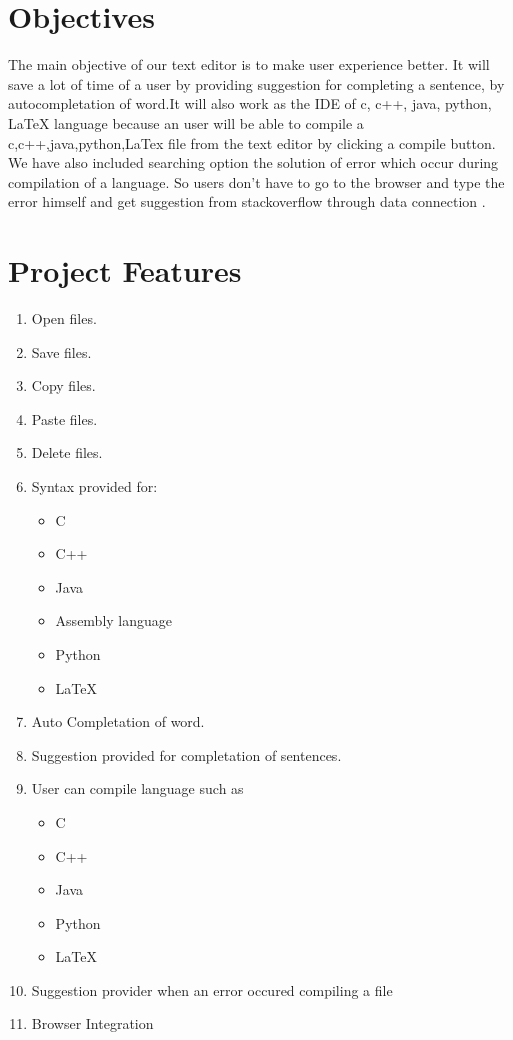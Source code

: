 \documentclass[a4paper]{article}
\begin{document}
\section{Objectives}
The main objective of our text editor is to make user experience better. It will save a lot of time of a user by providing suggestion for completing a sentence, by autocompletation of word.It will also work as the IDE of c, c++, java, python, LaTeX language because an user will be able to compile a c,c++,java,python,LaTex file from the text editor by clicking a compile button. We have also included searching option the solution of error which occur during compilation of a language. So users don't have to go to the browser and type the error himself and get suggestion from stackoverflow through data connection .

\section{Project Features}
\begin{enumerate}
\item Open files.
\item Save files.
\item Copy files.
\item Paste files.
\item Delete files.
\item Syntax provided for:
\begin{itemize}
\item C
\item C++
\item Java
\item Assembly language
\item Python
\item LaTeX
\end{itemize}
\item Auto Completation of word.
\item Suggestion provided for completation of sentences.
\item User can compile language such as
\begin{itemize}
\item C
\item C++
\item Java
\item Python
\item LaTeX
\end{itemize}
\item Suggestion provider when an error occured compiling a file
\item Browser Integration
\end{enumerate} 
\end{document}
